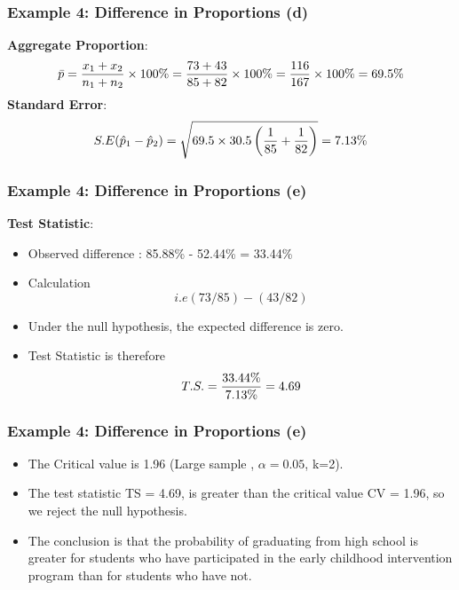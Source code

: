 \documentclass[a4]{beamer}
\begin{document}




\begin{frame}
\frametitle{Example 4: Difference in Proportions (d)}
\textbf{Aggregate Proportion}:\\
\[ \bar{p}  = {x_1  + x_2 \over n_1 + n_2} \times 100\% = {73+43 \over 85 + 82} \times 100\% = { 116 \over 167}\times 100\% = 69.5\% \]
\textbf{Standard Error}:\\
\[ S.E (\hat{p}_1 - \hat{p}_2)  =  \sqrt{69.5 \times 30.5  \left( {1 \over 85} + {1 \over 82}  \right)}  = 7.13\% \]

\end{frame}



\begin{frame}
\frametitle{Example 4: Difference in Proportions (e)}
\textbf{Test Statistic}:
\begin{itemize} \item Observed difference :
85.88\% - 52.44\%  = 33.44\% \item Calculation \[ i.e (73/85) - (43 /82) \]
\item Under the null hypothesis, the expected difference is zero.
\item Test Statistic is therefore \[T.S. = {33.44\% \over 7.13\%} = 4.69\]
\end{itemize}

\end{frame}
\begin{frame}
\frametitle{Example 4: Difference in Proportions (e)}
\begin{itemize}
\item The Critical value is 1.96 (Large sample , $\alpha = 0.05$, k=2).

\item The test statistic TS = 4.69, is greater than the critical value CV = 1.96, so we reject the null hypothesis.
\item The conclusion is that the probability of graduating from high school is greater for students who have participated in the early childhood intervention program than for students who have not.
\end{itemize}

\end{frame}
\end{document}
